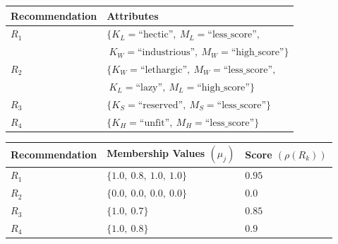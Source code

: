 \documentclass[conference]{IEEEtran}
\newcommand{\quotes}[1]{``#1''}
\begin{document}
\begin{table}
\small
{}
\begin{center}
\def\arraystretch{1.7}
\begin{tabular}{| l | l |}
\hline
\bf Recommendation & \bf Attributes \\
\hline
$R_1$ & $\{K_L = \text{\quotes{hectic}},\ M_L = \text{\quotes{less\_score}},$\\&$\ K_W=\text{\quotes{industrious}},\ M_W=\text{\quotes{high\_score}}\}$ \\
\hline
$R_2$ & $\{K_W = \text{\quotes{lethargic}},\ M_W = \text{\quotes{less\_score}},$\\& $\ K_L=\text{\quotes{lazy}},\ M_L=\text{\quotes{high\_score}}\}$ \\
\hline
$R_3$ & $\{K_S = \text{\quotes{reserved}},\ M_S = \text{\quotes{less\_score}}\}$ \\
\hline
$R_4$ & $\{K_H = \text{\quotes{unfit}},\ M_H = \text{\quotes{less\_score}}\}$ \\
\hline
\end{tabular}
\end{center}
\end{table}
\begin{table}
\small
{}
\begin{center}
\def\arraystretch{1.7}
\begin{tabular}{| l | l | l |}
\hline
\bf Recommendation & \bf Membership Values $(\mu_{j})$ & \bf Score $(\rho(R_k))$ \\
\hline
$R_1$ & $\{1.0,\ 0.8,\ 1.0,\ 1.0\}$ & $0.95$ \\
\hline
$R_2$ & $\{0.0,\ 0.0,\ 0.0,\ 0.0\}$ & $0.0$ \\
\hline
$R_3$ & $\{1.0,\ 0.7\}$ & $0.85$ \\
\hline
$R_4$ & $\{1.0,\ 0.8\}$ & $0.9$ \\
\hline
\end{tabular}
\end{center}
\end{table}
\end{document}
